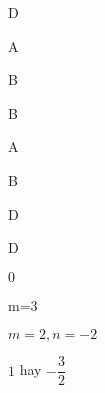 \begin{Solution}{24}
D
\end{Solution}
\begin{Solution}{25}
A
\end{Solution}
\begin{Solution}{26}
B
\end{Solution}
\begin{Solution}{27}
B
\end{Solution}
\begin{Solution}{28}
A
\end{Solution}
\begin{Solution}{29}
B
\end{Solution}
\begin{Solution}{30}
D
\end{Solution}
\begin{Solution}{31}
D
\end{Solution}
\begin{Solution}{32}
\end{Solution}
\begin{Solution}{33}
\end{Solution}
\begin{Solution}{34}
\end{Solution}
\begin{Solution}{35}
\end{Solution}
\begin{Solution}{36}
\end{Solution}
\begin{Solution}{37}
\end{Solution}
\begin{Solution}{38}
\end{Solution}
\begin{Solution}{39}
\end{Solution}
\begin{Solution}{40}
$0$
\end{Solution}
\begin{Solution}{41}
m=3
\end{Solution}
\begin{Solution}{42}
$m=2, n=-2$
\end{Solution}
\begin{Solution}{43}
$1$ hay $-\dfrac {3}{2}$
\end{Solution}
